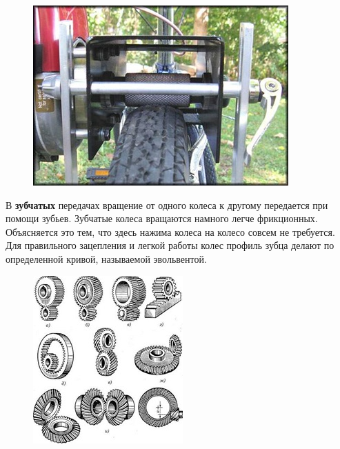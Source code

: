 \begin{figure}[h!]
	\begin{center}
		\includegraphics[width=1\linewidth]{chapters/chapter5/images/4}
		\caption{}
		\label{ris:image5x3}
	\end{center}
\end{figure}
\clearpage
В {\bfseries зубчатых} передачах вращение от одного колеса к другому передается при помощи зубьев. Зубчатые колеса вращаются намного легче фрикционных. Объясняется это тем, что здесь нажима колеса на колесо совсем не требуется. Для правильного зацепления и легкой работы колес профиль зубца делают по определенной кривой, называемой эвольвентой.
\begin{figure}[h!]
	\begin{center}
		\includegraphics[width=1\linewidth]{chapters/chapter5/images/5}
		\caption{}
		\label{ris:image5x4}
	\end{center}
\end{figure}
